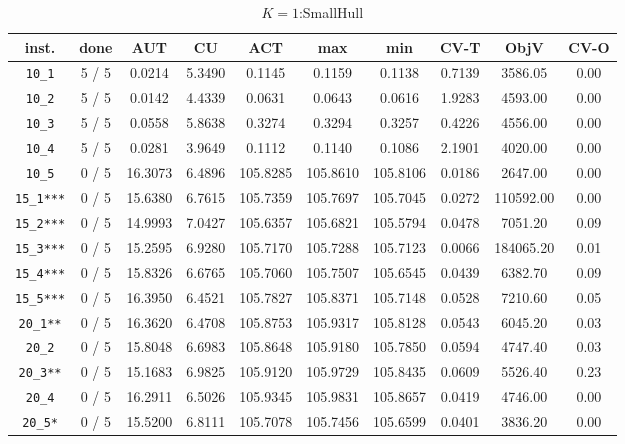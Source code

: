 \begin{table}[h!]
\begin{center}
\small
\begin{tabular}{| c | c | c | c | c | c | c | c | c | c |}
\hline
inst. & done & AUT & CU & ACT & max & min & CV-T & ObjV & CV-O \\
\hline
\verb|10_1| & 5 / 5 & 0.0214 & 5.3490 & 0.1145 & 0.1159 & 0.1138 & 0.7139 & 3586.05 & 0.00\\ 
\verb|10_2| & 5 / 5 & 0.0142 & 4.4339 & 0.0631 & 0.0643 & 0.0616 & 1.9283 & 4593.00 & 0.00\\ 
\verb|10_3| & 5 / 5 & 0.0558 & 5.8638 & 0.3274 & 0.3294 & 0.3257 & 0.4226 & 4556.00 & 0.00\\ 
\verb|10_4| & 5 / 5 & 0.0281 & 3.9649 & 0.1112 & 0.1140 & 0.1086 & 2.1901 & 4020.00 & 0.00\\ 
\verb|10_5| & 0 / 5 & 16.3073 & 6.4896 & 105.8285 & 105.8610 & 105.8106 & 0.0186 & 2647.00 & 0.00\\ 
\verb|15_1***| & 0 / 5 & 15.6380 & 6.7615 & 105.7359 & 105.7697 & 105.7045 & 0.0272 & 110592.00 & 0.00\\ 
\verb|15_2***| & 0 / 5 & 14.9993 & 7.0427 & 105.6357 & 105.6821 & 105.5794 & 0.0478 & 7051.20 & 0.09\\ 
\verb|15_3***| & 0 / 5 & 15.2595 & 6.9280 & 105.7170 & 105.7288 & 105.7123 & 0.0066 & 184065.20 & 0.01\\ 
\verb|15_4***| & 0 / 5 & 15.8326 & 6.6765 & 105.7060 & 105.7507 & 105.6545 & 0.0439 & 6382.70 & 0.09\\ 
\verb|15_5***| & 0 / 5 & 16.3950 & 6.4521 & 105.7827 & 105.8371 & 105.7148 & 0.0528 & 7210.60 & 0.05\\ 
\verb|20_1**| & 0 / 5 & 16.3620 & 6.4708 & 105.8753 & 105.9317 & 105.8128 & 0.0543 & 6045.20 & 0.03\\ 
\verb|20_2| & 0 / 5 & 15.8048 & 6.6983 & 105.8648 & 105.9180 & 105.7850 & 0.0594 & 4747.40 & 0.03\\ 
\verb|20_3**| & 0 / 5 & 15.1683 & 6.9825 & 105.9120 & 105.9729 & 105.8435 & 0.0609 & 5526.40 & 0.23\\ 
\verb|20_4| & 0 / 5 & 16.2911 & 6.5026 & 105.9345 & 105.9831 & 105.8657 & 0.0419 & 4746.00 & 0.00\\ 
\verb|20_5*| & 0 / 5 & 15.5200 & 6.8111 & 105.7078 & 105.7456 & 105.6599 & 0.0401 & 3836.20 & 0.00\\ 
\hline
\end{tabular}
\caption{$K=1$:SmallHull}
\label{table:hull:1}
\end{center}
\end{table}


